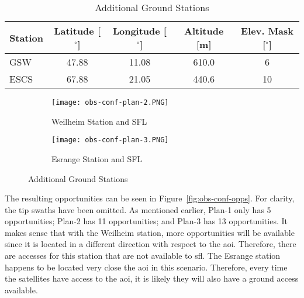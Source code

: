 \begin{table}[h] 
    \centering
    \caption{Additional Ground Stations}
    \begin{tabular}{ccccc}
	Station & Latitude [$^\circ$] & Longitude [$^\circ$] & Altitude [m] & Elev. Mask [$^\circ$] \\ \hline
	\multicolumn{1}{l|}{GSW}  & 47.88   & 11.08   & 610.0  & 6      \\
	\multicolumn{1}{l|}{ESCS} & 67.88   & 21.05   & 440.6  & 10      \\
    \end{tabular}
    \label{tab:additional-gs}
\end{table}

\begin{figure}[h]
    \centering
    \begin{subfigure}[b]{0.49\textwidth}
	\centering
	\texttt{[image: obs-conf-plan-2.PNG]} 
	\caption{Weilheim Station and SFL}
	\label{fig:obs-conf-gs-placements-1} 
    \end{subfigure}
    \hfill
    \begin{subfigure}[b]{0.49\textwidth}
	\centering
	\texttt{[image: obs-conf-plan-3.PNG]} 
	\caption{Esrange Station and SFL}
	\label{fig:obs-conf-gs-placements-2}
    \end{subfigure}
    \caption{Additional Ground Stations}
    \label{fig:obs-conf-gs-placements} 
\end{figure}

The resulting opportunities can be seen in Figure~\ref{fig:obs-conf-opps}.  For
clarity, the tip swaths have been omitted. As mentioned earlier, Plan-1 only
has 5 opportunities; Plan-2 has 11 opportunities; and Plan-3 has 13
opportunities. It makes sense that with the Weilheim station, more
opportunities will be available since it is located in a different direction
with respect to the \gls{aoi}. Therefore, there are accesses for this station
that are not available to \gls{sfl}. The Esrange station happens to be located
very close the \gls{aoi} in this scenario. Therefore, every time the satellites
have access to the \gls{aoi}, it is likely they will also have a ground access
available. 

